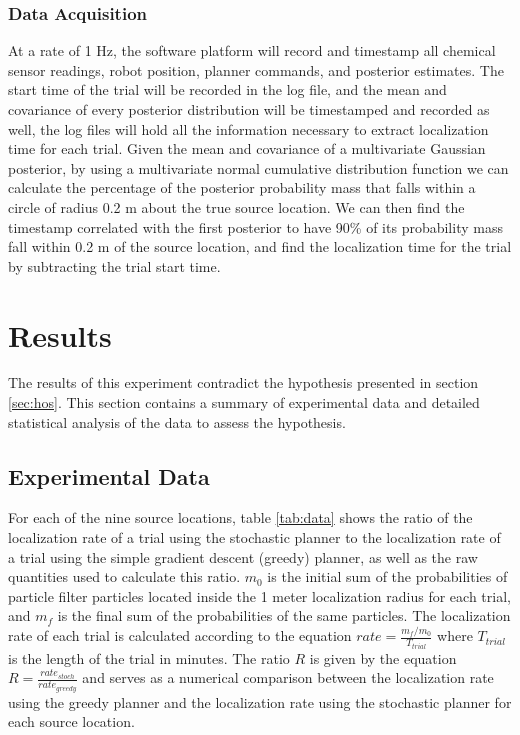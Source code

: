 \documentclass[submit, 12pt]{aiaa-pretty-modified}
\begin{document}
\subsubsection{Data Acquisition}
At a rate of 1 Hz, the software platform will record and
timestamp all chemical sensor readings, robot position, planner commands, and
posterior estimates. The start time of the trial will be recorded
in the log file, and the mean and covariance of every posterior
distribution will be timestamped and recorded as well, the log files will hold all the
information necessary to extract localization time for each trial.
Given the mean and covariance of a multivariate Gaussian
posterior, by using a multivariate normal cumulative distribution
function we can calculate the percentage of the posterior probability
mass that falls within a circle of radius 0.2 m about the true source
location. We can then find the timestamp correlated with the first
posterior to have 90\% of its probability mass fall within 0.2 m of
the source location, and find the localization time for the trial by
subtracting the trial start time.

\newpage

\section{Results}
\label{sec:results}
The results of this experiment contradict the hypothesis presented in
section \ref{sec:hos}.  This section contains  a summary of experimental data
and detailed statistical analysis of the data to assess the
hypothesis.

\subsection{Experimental Data}
For each of the nine source locations, table \ref{tab:data} shows the
ratio of the localization rate of
a trial using the stochastic planner to the localization rate of
a trial using the simple gradient descent (greedy) planner, as well as
the raw quantities used to calculate this ratio. $m_0$ is the initial sum of
the probabilities of particle filter particles located inside the 1
meter localization radius for each trial, and $m_f$ is the final sum
of the probabilities of the same particles. The localization rate of
each trial is calculated according to the equation $rate =
\frac{m_f/m_0}{T_{trial}}$ where $T_{trial}$ is the length of the
trial in minutes.  The ratio $R$ is given by the equation $R =
\frac{rate_{stoch}}{rate_{greedy}}$ and serves as a numerical
comparison between the localization rate using the greedy planner and
the localization rate using the stochastic planner for each source location.
\end{document}
